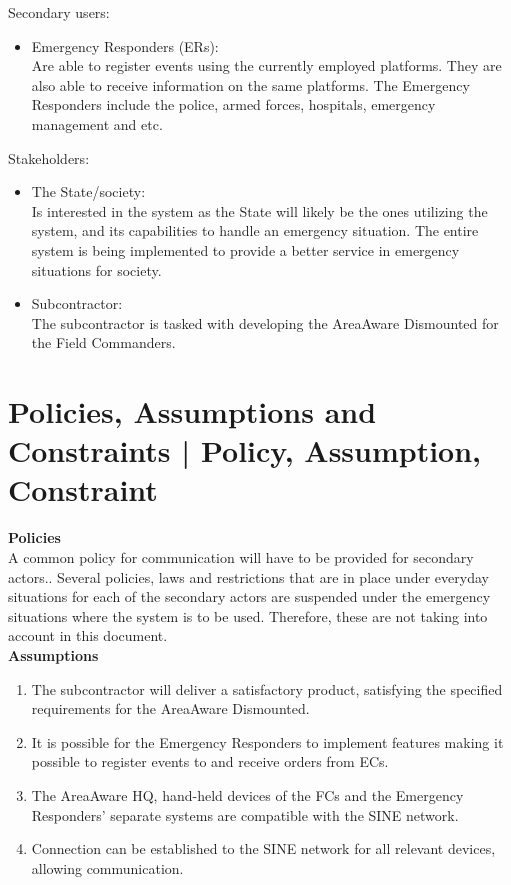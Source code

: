 \noindent Secondary users:
\begin{itemize}
	\item Emergency Responders (ERs):\\
	Are able to register events using the currently employed platforms. They are also able to receive information on the same platforms. The Emergency Responders include the police, armed forces, hospitals, emergency management and etc.
\end{itemize}

\noindent Stakeholders:
\begin{itemize}
	\item The State/society: \\
	Is interested in the system as the State will likely be the ones utilizing the system, and its capabilities to handle an emergency situation. The entire system is being implemented to provide a better service in emergency situations for society.
	\item Subcontractor:\\
	The subcontractor is tasked with developing the AreaAware Dismounted for the Field Commanders.
\end{itemize}


\section{Policies, Assumptions and Constraints | Policy, Assumption, Constraint}
\textbf{Policies} \\
A common policy for communication will have to be provided for secondary actors.. 
Several policies, laws and restrictions that are in place under everyday situations for each of the secondary actors are suspended under the emergency situations where the system is to be used. Therefore, these are not taking into account in this document.\\

\noindent \textbf{Assumptions}
\begin{enumerate}
	\itemsep0em
	\item The subcontractor will deliver a satisfactory product, satisfying the specified requirements for the AreaAware Dismounted.
	\item It is possible for the Emergency Responders to implement features making it possible to register events to and receive orders from ECs.
	\item The AreaAware HQ, hand-held devices of the FCs and the Emergency Responders’ separate systems are compatible with the SINE network.
	\item Connection can be established to the SINE network for all relevant devices, allowing communication.
\end{enumerate}

